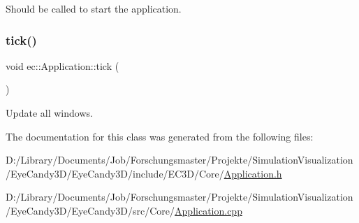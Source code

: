 Should be called to start the application. 

\mbox{\label{classec_1_1_application_a036ae53bcbf708c7a01deb199feeccdf}} 
\subsubsection{\texorpdfstring{tick()}{tick()}}
{\footnotesize\ttfamily void ec\+::\+Application\+::tick (\begin{DoxyParamCaption}{ }\end{DoxyParamCaption})\hspace{0.3cm}{\ttfamily [virtual]}}



Update all windows. 



The documentation for this class was generated from the following files\+:\begin{DoxyCompactItemize}
\item 
D\+:/\+Library/\+Documents/\+Job/\+Forschungsmaster/\+Projekte/\+Simulation\+Visualization/\+Eye\+Candy3\+D/\+Eye\+Candy3\+D/include/\+E\+C3\+D/\+Core/\mbox{\hyperlink{_application_8h}{Application.\+h}}\item 
D\+:/\+Library/\+Documents/\+Job/\+Forschungsmaster/\+Projekte/\+Simulation\+Visualization/\+Eye\+Candy3\+D/\+Eye\+Candy3\+D/src/\+Core/\mbox{\hyperlink{_application_8cpp}{Application.\+cpp}}\end{DoxyCompactItemize}
